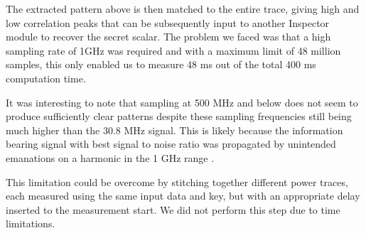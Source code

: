 
The extracted pattern above is then matched to the entire trace, giving high and low correlation peaks that can be subsequently input to another Inspector module to recover the secret scalar. The problem we faced was that a high sampling rate of 1GHz was required and with a maximum limit of 48 million samples, this only enabled us to measure 48 ms out of the total 400 ms computation time.

It was interesting to note that sampling at 500 MHz and below does not seem to produce sufficiently clear patterns despite these sampling frequencies still being much higher than the 30.8 MHz signal. This is likely because the information bearing signal with best signal to noise ratio was propagated by unintended emanations on a harmonic in the 1 GHz range \cite{ho2005analysis}.

This limitation could be overcome by stitching together different power traces, each measured using the same input data and key, but with an appropriate delay inserted to the measurement start. We did not perform this step due to time limitations.
